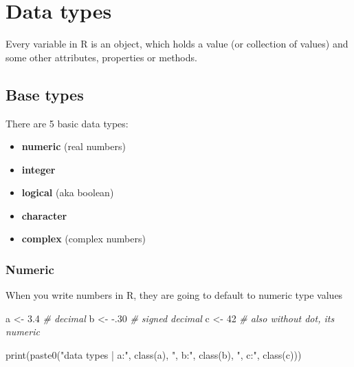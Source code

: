 \documentclass[
  oneside]{book}
\newenvironment{Shaded}{\begin{snugshade}}{\end{snugshade}}
\newcommand{\CommentTok}[1]{\textcolor[rgb]{0.56,0.35,0.01}{\textit{#1}}}
\newcommand{\DecValTok}[1]{\textcolor[rgb]{0.00,0.00,0.81}{#1}}
\newcommand{\FloatTok}[1]{\textcolor[rgb]{0.00,0.00,0.81}{#1}}
\newcommand{\FunctionTok}[1]{\textcolor[rgb]{0.00,0.00,0.00}{#1}}
\newcommand{\NormalTok}[1]{#1}
\newcommand{\OtherTok}[1]{\textcolor[rgb]{0.56,0.35,0.01}{#1}}
\newcommand{\SpecialCharTok}[1]{\textcolor[rgb]{0.00,0.00,0.00}{#1}}
\newcommand{\StringTok}[1]{\textcolor[rgb]{0.31,0.60,0.02}{#1}}
\providecommand{\tightlist}{%
  \setlength{\itemsep}{0pt}\setlength{\parskip}{0pt}}
\begin{document}
\hypertarget{data-types}{%
\section{Data types}\label{data-types}}

Every variable in R is an object, which holds a value (or collection of values) and some other attributes, properties or methods.

\hypertarget{base-types}{%
\subsection{Base types}\label{base-types}}

There are 5 basic data types:

\begin{itemize}
\tightlist
\item
  \textbf{numeric} (real numbers)
\item
  \textbf{integer}
\item
  \textbf{logical} (aka boolean)
\item
  \textbf{character}
\item
  \textbf{complex} (complex numbers)
\end{itemize}

\hypertarget{numeric}{%
\subsubsection{Numeric}\label{numeric}}

When you write numbers in R, they are going to
default to numeric type values

\begin{Shaded}
\begin{Highlighting}[]
\NormalTok{a }\OtherTok{\textless{}{-}} \FloatTok{3.4} \CommentTok{\# decimal}
\NormalTok{b }\OtherTok{\textless{}{-}} \SpecialCharTok{{-}}\NormalTok{.}\DecValTok{30} \CommentTok{\# signed decimal}
\NormalTok{c }\OtherTok{\textless{}{-}} \DecValTok{42} \CommentTok{\# also without dot, it\textquotesingle{}s numeric}

\FunctionTok{print}\NormalTok{(}\FunctionTok{paste0}\NormalTok{(}\StringTok{"data types | a:"}\NormalTok{, }\FunctionTok{class}\NormalTok{(a),}
            \StringTok{", b:"}\NormalTok{, }\FunctionTok{class}\NormalTok{(b),}
            \StringTok{", c:"}\NormalTok{, }\FunctionTok{class}\NormalTok{(c)))}
\end{Highlighting}
\end{Shaded}
\end{document}
